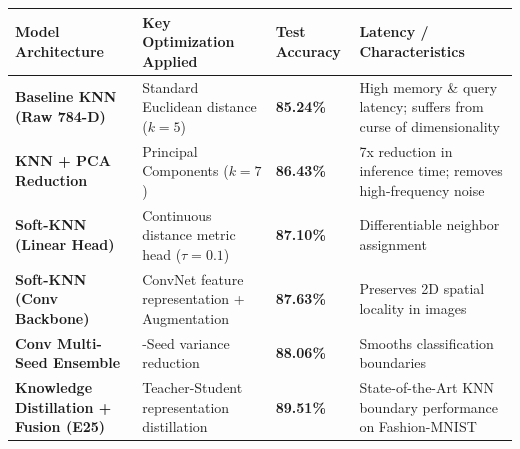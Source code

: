 \begin{longtable}[]{@{}
  >{\raggedright\arraybackslash}p{}
  >{\raggedright\arraybackslash}p{}
  >{\centering\arraybackslash}p{}
  >{\raggedright\arraybackslash}p{}@{}}
\toprule\noalign{}
\begin{minipage}[b]{\linewidth}\raggedright
Model Architecture
\end{minipage} & \begin{minipage}[b]{\linewidth}\raggedright
Key Optimization Applied
\end{minipage} & \begin{minipage}[b]{\linewidth}\centering
Test Accuracy
\end{minipage} & \begin{minipage}[b]{\linewidth}\raggedright
Latency / Characteristics
\end{minipage} \\
\midrule\noalign{}
\endhead
\bottomrule\noalign{}
\endlastfoot
\textbf{Baseline KNN (Raw 784-D)} & Standard Euclidean distance
(\(k=5\)) & \textbf{85.24\%} & High memory \& query latency; suffers
from curse of dimensionality \\
\textbf{KNN + PCA Reduction} & 64 Principal Components (\(k=7\)) &
\textbf{86.43\%} & 7x reduction in inference time; removes
high-frequency noise \\
\textbf{Soft-KNN (Linear Head)} & Continuous distance metric head
(\(\tau=0.1\)) & \textbf{87.10\%} & Differentiable neighbor
assignment \\
\textbf{Soft-KNN (Conv Backbone)} & ConvNet feature representation +
Augmentation & \textbf{87.63\%} & Preserves 2D spatial locality in
images \\
\textbf{Conv Multi-Seed Ensemble} & 5-Seed variance reduction &
\textbf{88.06\%} & Smooths classification boundaries \\
\textbf{Knowledge Distillation + Fusion (E25)} & Teacher-Student
representation distillation & \textbf{89.51\%} & State-of-the-Art KNN
boundary performance on Fashion-MNIST \\
\end{longtable}
